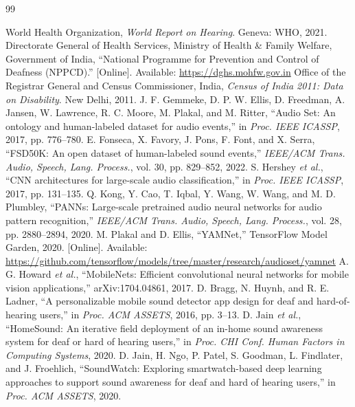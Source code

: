 \documentclass[12pt,a4paper,oneside]{report}
\begin{document}
\begin{thebibliography}{99}
 World Health Organization, \textit{World Report on Hearing}. Geneva: WHO, 2021.
 Directorate General of Health Services, Ministry of Health \& Family Welfare, Government of India, ``National Programme for Prevention and Control of Deafness (NPPCD).'' [Online]. Available: \url{https://dghs.mohfw.gov.in}
 Office of the Registrar General and Census Commissioner, India, \textit{Census of India 2011: Data on Disability}. New Delhi, 2011.
 J. F. Gemmeke, D. P. W. Ellis, D. Freedman, A. Jansen, W. Lawrence, R. C. Moore, M. Plakal, and M. Ritter, ``Audio Set: An ontology and human-labeled dataset for audio events,'' in \textit{Proc. IEEE ICASSP}, 2017, pp. 776--780.
 E. Fonseca, X. Favory, J. Pons, F. Font, and X. Serra, ``FSD50K: An open dataset of human-labeled sound events,'' \textit{IEEE/ACM Trans. Audio, Speech, Lang. Process.}, vol. 30, pp. 829--852, 2022.
 S. Hershey \textit{et al.}, ``CNN architectures for large-scale audio classification,'' in \textit{Proc. IEEE ICASSP}, 2017, pp. 131--135.
 Q. Kong, Y. Cao, T. Iqbal, Y. Wang, W. Wang, and M. D. Plumbley, ``PANNs: Large-scale pretrained audio neural networks for audio pattern recognition,'' \textit{IEEE/ACM Trans. Audio, Speech, Lang. Process.}, vol. 28, pp. 2880--2894, 2020.
 M. Plakal and D. Ellis, ``YAMNet,'' TensorFlow Model Garden, 2020. [Online]. Available: \url{https://github.com/tensorflow/models/tree/master/research/audioset/yamnet}
 A. G. Howard \textit{et al.}, ``MobileNets: Efficient convolutional neural networks for mobile vision applications,'' arXiv:1704.04861, 2017.
 D. Bragg, N. Huynh, and R. E. Ladner, ``A personalizable mobile sound detector app design for deaf and hard-of-hearing users,'' in \textit{Proc. ACM ASSETS}, 2016, pp. 3--13.
 D. Jain \textit{et al.}, ``HomeSound: An iterative field deployment of an in-home sound awareness system for deaf or hard of hearing users,'' in \textit{Proc. CHI Conf. Human Factors in Computing Systems}, 2020.
 D. Jain, H. Ngo, P. Patel, S. Goodman, L. Findlater, and J. Froehlich, ``SoundWatch: Exploring smartwatch-based deep learning approaches to support sound awareness for deaf and hard of hearing users,'' in \textit{Proc. ACM ASSETS}, 2020.

\end{thebibliography}
\end{document}
